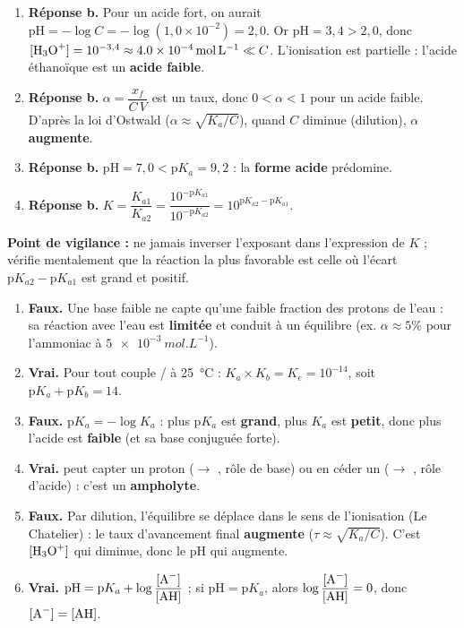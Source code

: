 \documentclass[11pt]{article}
\begin{document}
\begin{corrige}
\begin{enumerate}
\item \textbf{Réponse b.} Pour un acide fort, on aurait $\mathrm{pH} = -\log C = -\log(1,0\times 10^{-2}) = 2,0$. Or $\mathrm{pH} = 3,4 > 2,0$, donc $[\ce{H3O+}] = 10^{-3,4} \approx \SI{4,0e-4}{mol.L^{-1}} \ll C$. L'ionisation est partielle : l'acide éthanoïque est un \textbf{acide faible}.
\item \textbf{Réponse b.} $\alpha = \dfrac{x_f}{C\,V}$ est un taux, donc $0 < \alpha < 1$ pour un acide faible. D'après la loi d'Ostwald ($\alpha \approx \sqrt{K_a/C}$), quand $C$ diminue (dilution), $\alpha$ \textbf{augmente}.
\item \textbf{Réponse b.} $\mathrm{pH} = 7,0 < \mathrm{p}K_a = 9,2$ : la \textbf{forme acide}  prédomine.
\item \textbf{Réponse b.} $K = \dfrac{K_{a1}}{K_{a2}} = \dfrac{10^{-\mathrm{p}K_{a1}}}{10^{-\mathrm{p}K_{a2}}} = 10^{\mathrm{p}K_{a2}-\mathrm{p}K_{a1}}$.
\end{enumerate}
\textbf{Point de vigilance :} ne jamais inverser l'exposant dans l'expression de $K$ ; vérifie mentalement que la réaction la plus favorable est celle où l'écart $\mathrm{p}K_{a2}-\mathrm{p}K_{a1}$ est grand et positif.
\end{corrige}

\begin{corrige}
\begin{enumerate}
\item \textbf{Faux.} Une base faible ne capte qu'une faible fraction des protons de l'eau : sa réaction avec l'eau est \textbf{limitée} et conduit à un équilibre (ex. $\alpha \approx 5\%$ pour l'ammoniac à $\SI{5e-3}{mol.L^{-1}}$).
\item \textbf{Vrai.} Pour tout couple / à \SI{25}{\celsius} : $K_a \times K_b = K_e = 10^{-14}$, soit $\mathrm{p}K_a + \mathrm{p}K_b = 14$.
\item \textbf{Faux.} $\mathrm{p}K_a = -\log K_a$ : plus $\mathrm{p}K_a$ est \textbf{grand}, plus $K_a$ est \textbf{petit}, donc plus l'acide est \textbf{faible} (et sa base conjuguée forte).
\item \textbf{Vrai.}  peut capter un proton ($\rightarrow$ , rôle de base) ou en céder un ($\rightarrow$ , rôle d'acide) : c'est un \textbf{ampholyte}.
\item \textbf{Faux.} Par dilution, l'équilibre se déplace dans le sens de l'ionisation (Le Chatelier) : le taux d'avancement final \textbf{augmente} ($\tau \approx \sqrt{K_a/C}$). C'est $[\ce{H3O+}]$ qui diminue, donc le pH qui augmente.
\item \textbf{Vrai.} $\mathrm{pH} = \mathrm{p}K_a + \log\dfrac{[\ce{A-}]}{[\ce{AH}]}$ ; si $\mathrm{pH} = \mathrm{p}K_a$, alors $\log\dfrac{[\ce{A-}]}{[\ce{AH}]} = 0$, donc $[\ce{A-}] = [\ce{AH}]$.
\end{enumerate}
\end{corrige}
\end{document}
